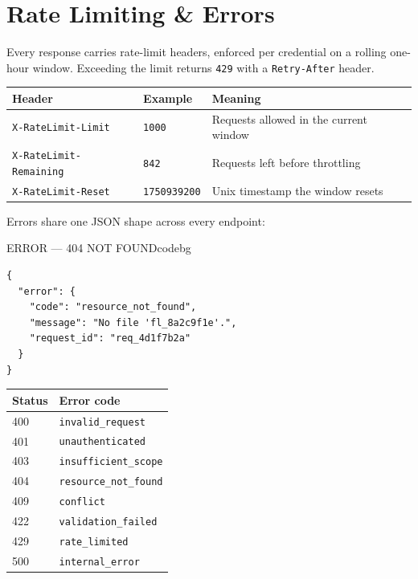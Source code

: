 \section{Rate Limiting \& Errors}
Every response carries rate-limit headers, enforced per credential on a rolling one-hour
window. Exceeding the limit returns \texttt{429} with a \texttt{Retry-After} header.

\begin{center}
\begin{tabularx}{\linewidth}{@{}l l X@{}}
\toprule
\rowcolor{panelgray}
\textbf{Header} & \textbf{Example} & \textbf{Meaning} \\
\midrule
\texttt{X-RateLimit-Limit} & \texttt{1000} & Requests allowed in the current window \\
\texttt{X-RateLimit-Remaining} & \texttt{842} & Requests left before throttling \\
\texttt{X-RateLimit-Reset} & \texttt{1750939200} & Unix timestamp the window resets \\
\bottomrule
\end{tabularx}
\end{center}

Errors share one JSON shape across every endpoint:

\begin{minipage}[t]{0.46\textwidth}
\begin{jsonpanel}{ERROR — 404 NOT FOUND}{codebg}
\begin{lstlisting}
{
  "error": {
    "code": "resource_not_found",
    "message": "No file 'fl_8a2c9f1e'.",
    "request_id": "req_4d1f7b2a"
  }
}
\end{lstlisting}
\end{jsonpanel}
\end{minipage}\hfill
\begin{minipage}[t]{0.5\textwidth}
\small
\begin{tabularx}{\linewidth}{@{}l X@{}}
\toprule
\rowcolor{panelgray}
\textbf{Status} & \textbf{Error code} \\
\midrule
400 & \texttt{invalid\_request} \\
401 & \texttt{unauthenticated} \\
403 & \texttt{insufficient\_scope} \\
404 & \texttt{resource\_not\_found} \\
409 & \texttt{conflict} \\
422 & \texttt{validation\_failed} \\
429 & \texttt{rate\_limited} \\
500 & \texttt{internal\_error} \\
\bottomrule
\end{tabularx}
\end{minipage}
\par

